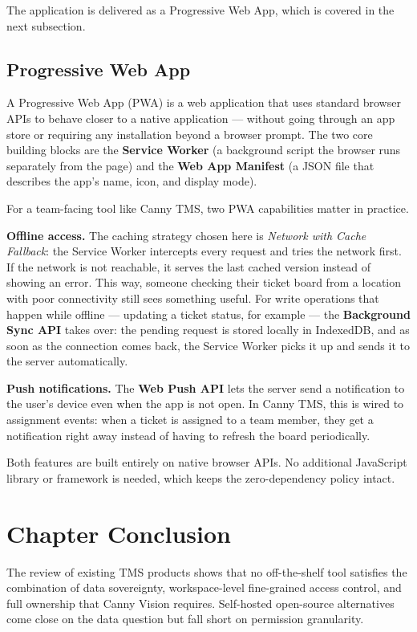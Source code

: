 The application is delivered as a Progressive Web App, which is covered in the next subsection.

\subsection{Progressive Web App}

A Progressive Web App (PWA) is a web application that uses standard browser APIs to behave
closer to a native application --- without going through an app store or requiring any
installation beyond a browser prompt. The two core building blocks are the
\textbf{Service Worker} (a background script the browser runs separately from the page) and
the \textbf{Web App Manifest} (a JSON file that describes the app's name, icon, and
display mode).

For a team-facing tool like Canny TMS, two PWA capabilities matter in practice.

\textbf{Offline access.} The caching strategy chosen here is \textit{Network with Cache
Fallback}: the Service Worker intercepts every request and tries the network first. If the
network is not reachable, it serves the last cached version instead of showing an error.
This way, someone checking their ticket board from a location with poor connectivity still
sees something useful. For write operations that happen while offline --- updating a ticket
status, for example --- the \textbf{Background Sync API} takes over: the pending request
is stored locally in IndexedDB, and as soon as the connection comes back, the Service
Worker picks it up and sends it to the server automatically.

\textbf{Push notifications.} The \textbf{Web Push API} lets the server send a notification
to the user's device even when the app is not open. In Canny TMS, this is wired to
assignment events: when a ticket is assigned to a team member, they get a notification
right away instead of having to refresh the board periodically.

Both features are built entirely on native browser APIs. No additional JavaScript library
or framework is needed, which keeps the zero-dependency policy intact.

\section{Chapter Conclusion}

The review of existing TMS products shows that no off-the-shelf tool satisfies the combination of data sovereignty, workspace-level fine-grained access control, and full ownership that Canny Vision requires. Self-hosted open-source alternatives come close on the data question but fall short on permission granularity.

